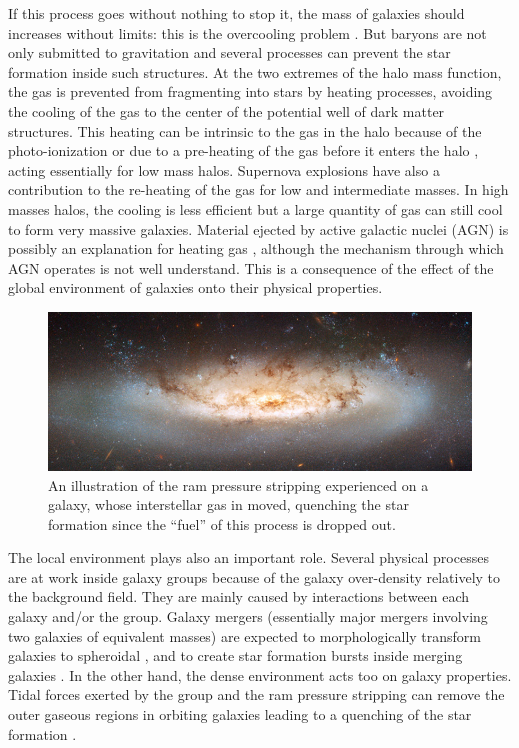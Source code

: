 If this process goes without nothing to stop it, the mass of galaxies should
increases without limits: this is the overcooling problem \citep{White+78}. But
baryons are not only submitted to gravitation and several processes can prevent
the star formation inside such structures. At the two extremes of the halo mass
function, the gas is prevented from fragmenting into stars by heating
processes, avoiding the cooling of the gas to the center of the potential well
of dark matter structures. This heating can be intrinsic to the gas in the halo
because of the photo-ionization \citep{Rees+86} or due to a pre-heating of the
gas before it enters the halo \citep{Borgani+01}, acting essentially for low
mass halos. Supernova explosions have also a contribution to the re-heating of
the gas \citep{Dekel+86, Efstathiou+00} for low and intermediate masses. In
high masses halos, the cooling is less efficient but a large quantity of gas
can still cool to form very massive galaxies. Material ejected by active
galactic nuclei (AGN) is possibly an explanation for heating gas
\citep{Silk+98}, although the mechanism through which AGN operates is not well
understand. This is a consequence of the effect of the global environment of
galaxies onto their physical properties.
%
\begin{figure}[htb]
    \centering
    \includegraphics[width=\linewidth]{figures/introduction/rampressure.jpg}
    \caption{An illustration of the ram pressure stripping experienced on a
    galaxy, whose interstellar gas in moved, quenching the star formation since
the ``fuel'' of this process is dropped out.\label{fig:rampressure}}
\end{figure}

The local environment plays also an important role. Several physical processes
are at work inside galaxy groups because of the galaxy over-density relatively
to the background field. They are mainly caused by interactions between each
galaxy and/or the group. Galaxy mergers (essentially major mergers involving
two galaxies of equivalent masses) are expected to morphologically transform
galaxies to spheroidal \citep{Naab+99,Bournaud+05}, and to create star
formation bursts inside merging galaxies \citep{Cox+08,Teyssier+10}. In the
other hand, the dense environment acts too on galaxy properties. Tidal forces
exerted by the group and the ram pressure stripping can remove the outer
gaseous regions in orbiting galaxies leading to a quenching of the star
formation \citep{Larson+80,Bekki+13}.

